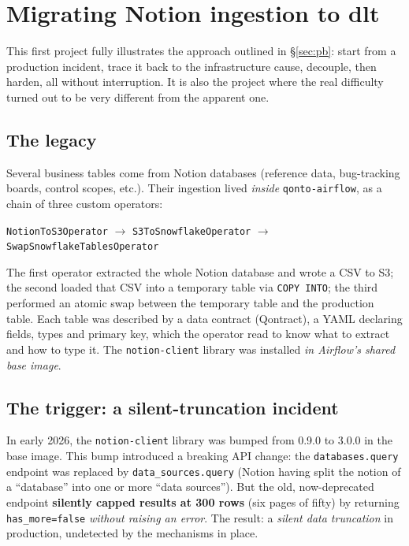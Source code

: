 \chapter{Migrating Notion ingestion to dlt}\label{ch:notion}

This first project fully illustrates the approach outlined in \S\ref{sec:pb}: start from a production incident, trace it back to the infrastructure cause, decouple, then harden, all without interruption. It is also the project where the real difficulty turned out to be very different from the apparent one.

\section{The legacy}

Several business tables come from Notion databases (reference data, bug-tracking boards, control scopes, etc.). Their ingestion lived \emph{inside} \texttt{qonto-airflow}, as a chain of three custom operators:

\begin{center}\small
\texttt{NotionToS3Operator} $\rightarrow$ \texttt{S3ToSnowflakeOperator} $\rightarrow$ \texttt{SwapSnowflakeTablesOperator}
\end{center}

The first operator extracted the whole Notion database and wrote a CSV to S3; the second loaded that CSV into a temporary table via \texttt{COPY INTO}; the third performed an atomic swap between the temporary table and the production table. Each table was described by a data contract (Qontract), a YAML declaring fields, types and primary key, which the operator read to know what to extract and how to type it. The \texttt{notion-client} library was installed \emph{in Airflow's shared base image}.

\section{The trigger: a silent-truncation incident}

In early 2026, the \texttt{notion-client} library was bumped from 0.9.0 to 3.0.0 in the base image. This bump introduced a breaking API change: the \texttt{databases.query} endpoint was replaced by \texttt{data\_sources.query} (Notion having split the notion of a ``database'' into one or more ``data sources''). But the old, now-deprecated endpoint \textbf{silently capped results at 300 rows} (six pages of fifty) by returning \texttt{has\_more=false} \emph{without raising an error}. The result: a \emph{silent data truncation} in production, undetected by the mechanisms in place.

